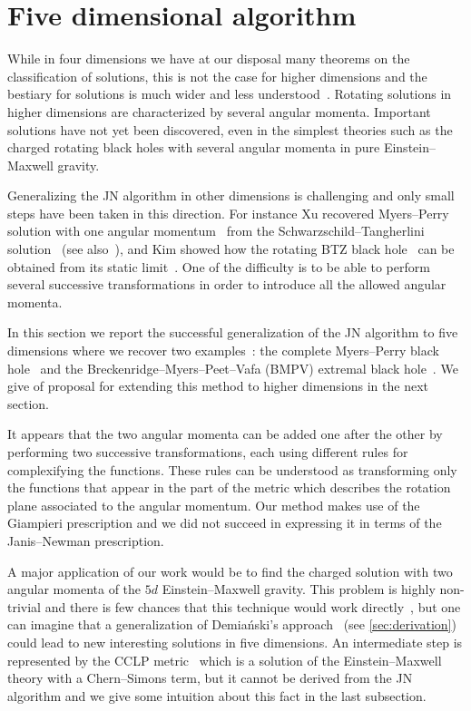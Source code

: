 \section{Five dimensional algorithm}
\label{sec:five}


While in four dimensions we have at our disposal many theorems on the classification of solutions, this is not the case for higher dimensions and the bestiary for solutions is much wider and less understood~\cite{Emparan:2008:BlackHolesHigher, Adamo:2014:KerrNewmanMetricReview}.
Rotating solutions in higher dimensions are characterized by several angular momenta.
Important solutions have not yet been discovered, even in the simplest theories such as the charged rotating black holes with several angular momenta in pure Einstein--Maxwell gravity.

Generalizing the JN algorithm in other dimensions is challenging and only small steps have been taken in this direction.
For instance Xu recovered Myers--Perry solution with one angular momentum~\cite{Myers:1986:BlackHolesHigher} from the Schwarzschild--Tangherlini solution~\cite{Xu:1988:ExactSolutionsEinstein} (see also~\cite{Aliev:2006:RotatingBlackHoles}), and Kim showed how the rotating BTZ black hole~\cite{Banados:1992:BlackHoleThree} can be obtained from its static limit~\cite{Kim:1997:NotesSpinningAdS3, Kim:1999:SpinningBTZBlack}.
One of the difficulty is to be able to perform several successive transformations in order to introduce all the allowed angular momenta.

In this section we report the successful generalization of the JN algorithm to five dimensions where we recover two examples~\cite{Erbin:2015:FivedimensionalJanisNewmanAlgorithm}: the complete Myers--Perry black hole~\cite{Myers:1986:BlackHolesHigher} and the Breckenridge--Myers--Peet--Vafa (BMPV) extremal black hole~\cite{Breckenridge:1997:DbranesSpinningBlack}.
We give of proposal for extending this method to higher dimensions in the next section.

It appears that the two angular momenta can be added one after the other by performing two successive transformations, each using different rules for complexifying the functions.
These rules can be understood as transforming only the functions that appear in the part of the metric which describes the rotation plane associated to the angular momentum.
Our method makes use of the Giampieri prescription and we did not succeed in expressing it in terms of the Janis--Newman prescription.

A major application of our work would be to find the charged solution with two angular momenta of the $5d$ Einstein--Maxwell gravity.
This problem is highly non-trivial and there is few chances that this technique would work directly~\cite{Aliev:2006:RotatingBlackHoles}, but one can imagine that a generalization of Demiański's approach~\cite{Demianski:1972:NewKerrlikeSpacetime} (see \cref{sec:derivation}) could lead to new interesting solutions in five dimensions.
An intermediate step is represented by the CCLP metric~\cite{Chong:2005:GeneralNonExtremalRotating} which is a solution of the Einstein--Maxwell theory with a Chern--Simons term, but it cannot be derived from the JN algorithm and we give some intuition about this fact in the last subsection.

